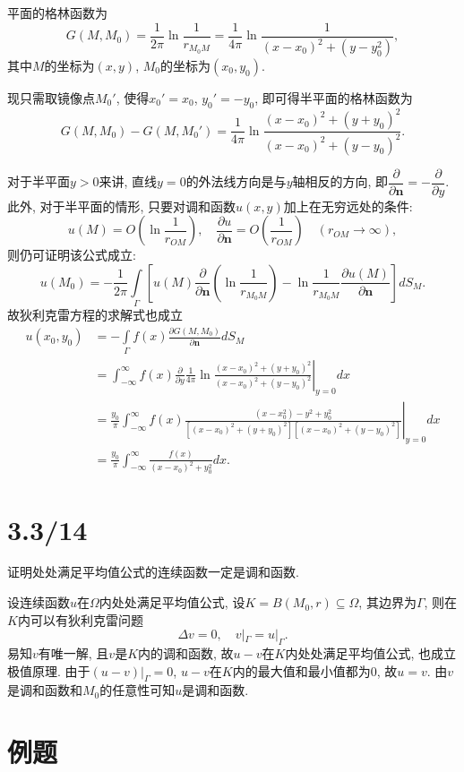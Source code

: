 \documentclass[11pt,a4paper]{article}
\begin{document}
平面的格林函数为
$$G(M,M_0)=\frac{1}{2\pi}\ln\frac{1}{r_{M_0M}}=\frac{1}{4\pi}\ln\frac{1}{(x-x_0)^2+(y-y_0^2)},$$
其中$M$的坐标为$(x,y)$, $M_0$的坐标为$(x_0,y_0)$.

现只需取镜像点$M_0'$, 使得$x_0'=x_0$, $y_0'=-y_0$, 即可得半平面的格林函数为
$$G(M,M_0)-G(M,M_0')=\frac{1}{4\pi}\ln\frac{(x-x_0)^2+(y+y_0)^2}{(x-x_0)^2+(y-y_0)^2}.$$

对于半平面$y>0$来讲, 直线$y=0$的外法线方向是与$y$轴相反的方向, 即$\dfrac{\partial}{\partial\mathbf{n}}=-\dfrac{\partial}{\partial y}$. 此外, 对于半平面的情形, 只要对调和函数$u(x,y)$加上在无穷远处的条件:
$$u(M)=O\left(\ln\frac{1}{r_{OM}}\right),\quad\frac{\partial u}{\partial\mathbf{n}}=O\left(\frac{1}{r_{OM}}\right)\quad (r_{OM}\to\infty),$$
则仍可证明该公式成立:
$$u(M_0)=-\frac{1}{2\pi}\int\limits_{\Gamma}\left[u(M)\frac{\partial}{\partial\mathbf{n}}\left(\ln\frac{1}{r_{M_0M}}\right)-\ln\frac{1}{r_{M_0M}}\frac{\partial u(M)}{\partial\mathbf{n}}\right]dS_M.$$
故狄利克雷方程的求解式也成立
\begin{align*}
  u(x_0,y_0)
   & =-\int\limits_{\Gamma}f(x)\frac{\partial G(M,M_0)}{\partial\mathbf{n}}dS_M                                                                  \\
   & =\int_{-\infty}^\infty f(x)\frac{\partial}{\partial y}\left.\frac{1}{4\pi}\ln\frac{(x-x_0)^2+(y+y_0)^2}{(x-x_0)^2+(y-y_0)^2}\right|_{y=0}dx \\
   & =\frac{y_0}{\pi}\int_{-\infty}^\infty f(x)\left.\frac{(x-x_0^2)-y^2+y_0^2}{[(x-x_0)^2+(y+y_0)^2][(x-x_0)^2+(y-y_0)^2]}\right|_{y=0}dx       \\
   & =\frac{y_0}{\pi}\int_{-\infty}^\infty \frac{f(x)}{(x-x_0)^2+y_0^2}dx.
\end{align*}

\section{3.3/14}
\begin{problem}
证明处处满足平均值公式的连续函数一定是调和函数.
\end{problem}

设连续函数$u$在$\Omega$内处处满足平均值公式, 设$K=B(M_0,r)\subseteq\Omega$, 其边界为$\Gamma$, 则在$K$内可以有狄利克雷问题
$$\Delta v=0,\quad v|_{\Gamma}=u|_{\Gamma}.$$
易知$v$有唯一解, 且$v$是$K$内的调和函数, 故$u-v$在$K$内处处满足平均值公式, 也成立极值原理. 由于$(u-v)|_\Gamma=0$, $u-v$在$K$内的最大值和最小值都为0, 故$u=v$. 由$v$是调和函数和$M_0$的任意性可知$u$是调和函数.

\section*{例题}
\end{document}
